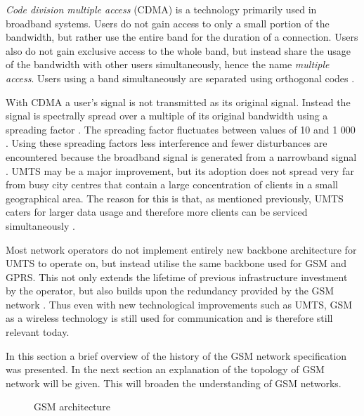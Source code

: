 \emph{Code division multiple access} (CDMA) is a technology primarily used in broadband systems. Users do not gain access to only a small portion of the bandwidth, but rather use the entire band for the duration of a connection. Users also do not gain exclusive access to the whole band, but instead share the usage of the bandwidth with other users simultaneously, hence the name \emph{multiple access}. Users using a band simultaneously are separated using orthogonal codes \cite{GSMArchitectureProtocolsServices}.

With CDMA a user's signal is not transmitted as its original signal. Instead the signal is spectrally spread over a multiple of its original bandwidth using a spreading factor \cite{GSMArchitectureProtocolsServices}. The spreading factor fluctuates between values of 10 and 1 000 \cite{GSMArchitectureProtocolsServices}. Using these spreading factors less interference and fewer disturbances are encountered because the broadband signal is generated from a narrowband signal \cite{GSMArchitectureProtocolsServices}.
UMTS may be a major improvement, but its adoption does not spread very far from busy city centres that contain a large concentration of clients in a small geographical area. The reason for this is that, as mentioned previously, UMTS caters for larger data usage and therefore more clients can be serviced simultaneously \cite{GSMArchitectureProtocolsServices}.

Most network operators do not implement entirely new backbone architecture for UMTS\label{UMTSGSMBackbone} to operate on, but instead utilise the same backbone used for GSM and GPRS. This not only extends the lifetime of previous infrastructure investment by the operator, but also builds upon the redundancy provided by the GSM network \cite{GSMArchitectureProtocolsServices}. Thus even with new technological improvements such as UMTS, GSM as a wireless technology is still used for communication and is therefore still relevant today.

In this section a brief overview of the history of the GSM network specification was presented. In the next section an explanation of the topology of GSM network will be given. This will broaden the understanding of GSM networks.

\begin{figure}[hptb]
	\begin{centering}
		
		\caption{GSM architecture}
		\label{fig:GSMArchitecture}
	\end{centering}
\end{figure}

